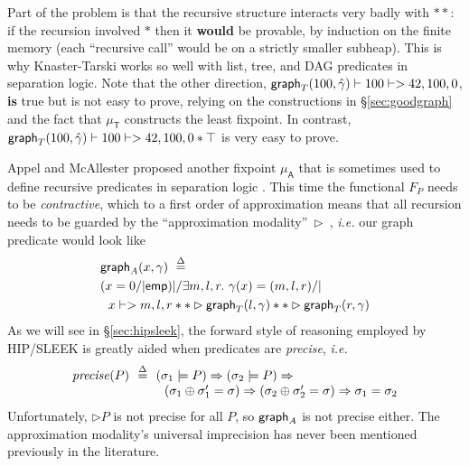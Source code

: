 Part of the problem is that the recursive structure interacts very badly with $**$: if the recursion involved $*$ then it \textbf{would} be provable, by induction on the finite memory (each ``recursive call'' would be on a strictly smaller subheap).  This is why Knaster-Tarski works so well with list, tree, and DAG predicates in separation logic.  Note that the other direction, \mbox{$\mathsf{graph}_T(100,\hat{\gamma}) |- 100 |-> 42,100,0$},
\textbf{is} true but is not easy to prove, relying on the constructions in \S\ref{sec:goodgraph} and the fact that $\mu_{\mathsf{T}}$ constructs the least fixpoint.  In contrast, $\mathsf{graph}_T(100,\hat{\gamma}) |- 100 |-> 42,100,0 * \top$ is very easy to prove. %





Appel and McAllester proposed another fixpoint $\mu_{\mathsf{A}}$
that is sometimes used to define recursive predicates in separation
logic \cite{appel:fixpoint}.  This time the functional $F_P$ needs to be
\emph{contractive}, which to a first order of approximation means that
all recursion needs to be guarded by the ``approximation
modality''~$\rhd$~\cite{appel:vmm}, \emph{i.e.} our graph predicate would
look like
\begin{align*}
\grapham(x, \gamma) ~ &\stackrel{\Delta}{=}\\
 (x = 0 /| \p{emp}) & |/ \exists m,l,r.~ \gamma(x)=(m,l,r) /| \null \\
 x |-> m,l,r & ** \rhd \graphkt(l, \gamma) ** \rhd \graphkt(r, \gamma)
\end{align*}
As we will see in \S\ref{sec:hipsleek}, the forward style of reasoning employed by
HIP/SLEEK is greatly aided when predicates are \emph{precise}, \emph{i.e.}
\[
\begin{array}{@{}l@{}l@{}}
\m{precise}(P) ~~ \defeq ~~ & (\sigma_1 |= P) => (\sigma_2 |= P) => \\
& ~~ (\sigma_1 \oplus \sigma_1' = \sigma) => (\sigma_2 \oplus \sigma_2' = \sigma) => \sigma_1 = \sigma_2
\end{array}
\]
Unfortunately, $\rhd P$ is not precise for all $P$, so $\mathsf{graph}_A$ is not precise either.  The approximation modality's universal imprecision has never been mentioned previously in the literature.  %

